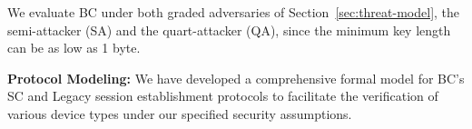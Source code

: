 We evaluate BC under both graded adversaries of Section~\ref{sec:threat-model}, the semi-attacker
(SA) and the quart-attacker (QA), since the minimum key length can be as low as 1 byte.

\noindent
\textbf{Protocol Modeling:}
We have developed a comprehensive formal model for BC's SC and Legacy session establishment protocols to facilitate the verification of various device types under our specified security assumptions.


